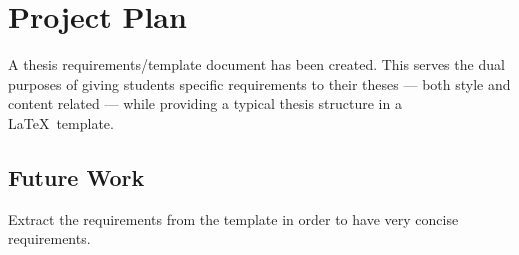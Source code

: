 \chapter{Project Plan}\label{ch:projectplan}

A thesis requirements/template document has been created.  This serves the
dual purposes of giving students specific requirements to their theses ---
both style and content related --- while providing a typical thesis
structure in a \LaTeX\ template.

\section{Future Work}

Extract the requirements from the template in order to have very concise
requirements.
